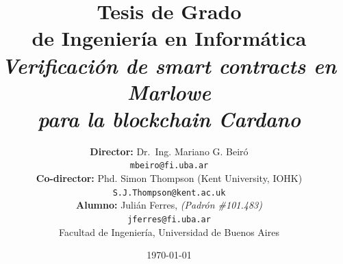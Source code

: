 \documentclass[12pt]{book}
\begin{document}
\begin{titlepage}

    \title{     \textbf{Tesis de Grado \\ de Ingeniería en Informática}\\[2.5ex]
        \textit{Verificación de smart contracts en Marlowe\\ para la blockchain Cardano}}

    \author{
        \textbf{Director:} Dr.\ Ing. Mariano G. Beiró \\
        \texttt{mbeiro@fi.uba.ar}\\[2.5ex]
        \textbf{Co-director:} Phd. Simon Thompson (Kent University, IOHK) \\
        \texttt{S.J.Thompson@kent.ac.uk}
        \\[2.5ex]
        \textbf{Alumno:} Julián Ferres, \textit{(Padrón \#101.483)}                                \\
        \texttt{ jferres@fi.uba.ar }                                    \\[2.5ex]
        \normalsize{Facultad de Ingeniería, Universidad de Buenos Aires}        \\
    }
    \date{\today}

\end{titlepage}

\maketitle
\thispagestyle{empty}

\maketitle

{
    \hypersetup{linkcolor=black}
    \tableofcontents
}

\end{document}
